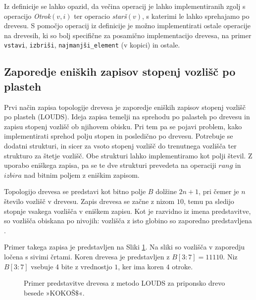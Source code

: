 Iz definicije se lahko opazid, da večina operacij je lahko implementiranih zgolj s operacijo \textit{Otrok}$(v,i)$ ter operacio \textit{starš}$(v)$, s katerimi le lahko sprehajamo po drevesu. S pomočjo operacij iz definicije je možno implementirati ostale operacije na drevesih, ki so bolj specifične za posamično implementacijo drevesa, na primer \texttt{vstavi}, \texttt{izbriši}, \texttt{najmanjši\_element} (v kopici) in ostale.

\subsection{Zaporedje eniških zapisov stopenj vozlišč po plasteh}\label{sec:LOUDS}

Prvi način zapisa topologije drevesa je zaporedje eniških zapisov stopenj vozlišč po plasteh (LOUDS). Ideja zapisa temelji na sprehodu po palasteh po drevesu in zapisu stopenj vozlišč ob njihovem obisku. Pri tem pa se pojavi problem, kako implementirati sprehod polju stopen in posledično po drevesu. Potrebuje se dodatni strukturi, in sicer za vsoto stopenj vozlišč do trenutnega vozlišča ter strukturo za štetje vozlišč. Obe strukturi lahko implementiramo kot polji števil. Z uporabo eniškega zapisa, pa se te dve strukturi prevedeta na operaciji $rang$ in $izbira$ nad bitnim poljem z eniškim zapisom.    

Topologijo drevesa se predstavi kot bitno polje $B$ dolžine $2n+1$, pri čemer je $n$ število vozlišč v drevesu. Zapis drevesa se začne z nizom $10$, temu pa sledijo stopnje vsakega vozlišča v eniškem zapisu. Kot je razvidno iz imena predstavitve, so vozlišča obiskana po nivojih: vozlišča z isto globino so zaporedno predstavljena \cite{Navarro2016}.

Primer takega zapisa je predstavljen na Sliki \ref{fig:LOUDS}. Na sliki so vozlišča v zaporedju ločena s sivimi črtami. Koren drevesa je predstavljen z $B[3:7]=11110$. Niz $B[3:7]$ vsebuje 4 bite z vrednostjo $1$, ker ima koren $4$ otroke.

\begin{figure}[htb]
    \begin{center}
        
        \caption{Primer predstavitve drevesa z metodo LOUDS za priponsko drevo besede »KOKOŠ$\$$«.} 
        \label{fig:LOUDS}
    \end{center}
\end{figure}

